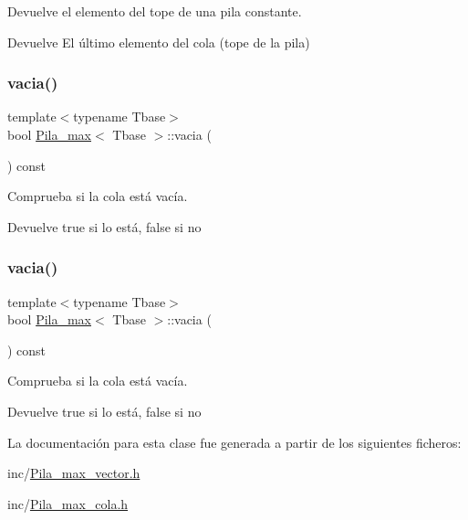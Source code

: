 Devuelve el elemento del tope de una pila constante. 

\begin{DoxyReturn}{Devuelve}
El último elemento del cola (tope de la pila) 
\end{DoxyReturn}
\mbox{\label{classPila__max_aa61d11b7ee3e037dea632d185ca146a0}} 
\subsubsection{\texorpdfstring{vacia()}{vacia()}\hspace{0.1cm}{\footnotesize\ttfamily [1/2]}}
{\footnotesize\ttfamily template$<$typename Tbase$>$ \\
bool \hyperlink{classPila__max}{Pila\+\_\+max}$<$ Tbase $>$\+::vacia (\begin{DoxyParamCaption}{ }\end{DoxyParamCaption}) const}



Comprueba si la cola está vacía. 

\begin{DoxyReturn}{Devuelve}
true si lo está, false si no 
\end{DoxyReturn}
\mbox{\label{classPila__max_aa61d11b7ee3e037dea632d185ca146a0}} 
\subsubsection{\texorpdfstring{vacia()}{vacia()}\hspace{0.1cm}{\footnotesize\ttfamily [2/2]}}
{\footnotesize\ttfamily template$<$typename Tbase$>$ \\
bool \hyperlink{classPila__max}{Pila\+\_\+max}$<$ Tbase $>$\+::vacia (\begin{DoxyParamCaption}{ }\end{DoxyParamCaption}) const}



Comprueba si la cola está vacía. 

\begin{DoxyReturn}{Devuelve}
true si lo está, false si no 
\end{DoxyReturn}


La documentación para esta clase fue generada a partir de los siguientes ficheros\+:\begin{DoxyCompactItemize}
\item 
inc/\hyperlink{Pila__max__vector_8h}{Pila\+\_\+max\+\_\+vector.\+h}\item 
inc/\hyperlink{Pila__max__cola_8h}{Pila\+\_\+max\+\_\+cola.\+h}\end{DoxyCompactItemize}
